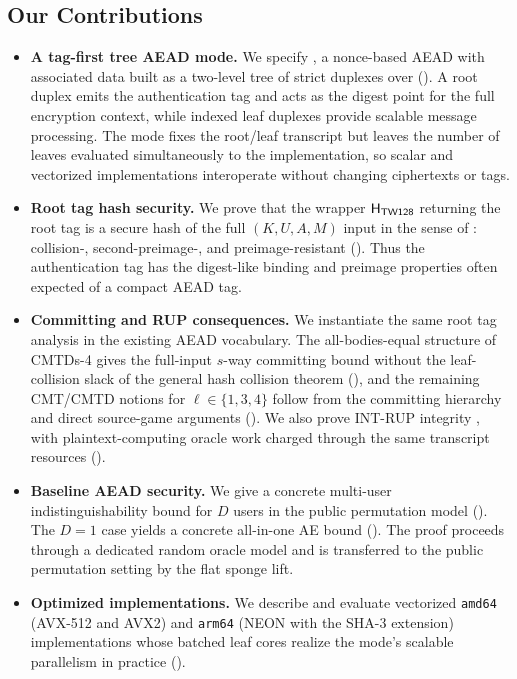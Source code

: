 \subsection{Our Contributions}
\label{sec:contributions}

\begin{itemize}
\item \textbf{A tag-first tree AEAD mode.} We specify \TW{}, a nonce-based AEAD
  with associated data built as a two-level tree of strict \cite{BDPV11}
  duplexes over \Keccakp{} (). A root duplex emits the
  authentication tag and acts as the digest point for the full encryption
  context, while indexed leaf duplexes provide scalable message processing.
  The mode fixes the root/leaf transcript but leaves the number of leaves
  evaluated simultaneously to the implementation, so scalar and vectorized
  implementations interoperate without changing ciphertexts or tags.

\item \textbf{Root tag hash security.} We prove that the wrapper $\mathsf{H}_{\mathsf{TW128}}$
  returning the root tag is a secure hash of the full $(K, U, A, M)$ input in
  the sense of \cite{RS04}: collision-, second-preimage-, and
  preimage-resistant
  (). Thus the
  authentication tag has the digest-like binding and preimage properties often
  expected of a compact AEAD tag.

\item \textbf{Committing and RUP consequences.} We instantiate the same root
  tag analysis in the existing AEAD vocabulary. The all-bodies-equal structure
  of \textsf{CMTDs-4} gives the full-input $s$-way committing bound without the
  leaf-collision slack of the general hash collision theorem \cite{BH22}
  (), and the remaining \textsf{CMT}/\textsf{CMTD} notions
  for $\ell \in \{1, 3, 4\}$ follow from the committing hierarchy and direct
  source-game arguments (). We also prove
  \textsf{INT-RUP} integrity \cite{ABLMMY14}, with plaintext-computing oracle
  work charged through the same transcript resources ().

\item \textbf{Baseline AEAD security.} We give a concrete multi-user
  indistinguishability bound \cite{BT16} for $D$ users in the public
  permutation model (). The $D = 1$ case yields a concrete
  all-in-one AE bound \cite{RS06} (). The proof proceeds through a
  dedicated \TW{} random oracle model and is transferred to the public
  permutation setting by the \cite{BDPV08} flat sponge lift.

\item \textbf{Optimized implementations.} We describe and evaluate vectorized
  \texttt{amd64} (AVX-512 and AVX2) and \texttt{arm64} (NEON with the SHA-3
  extension) implementations whose batched leaf cores realize the mode's
  scalable parallelism in practice ().
\end{itemize}

